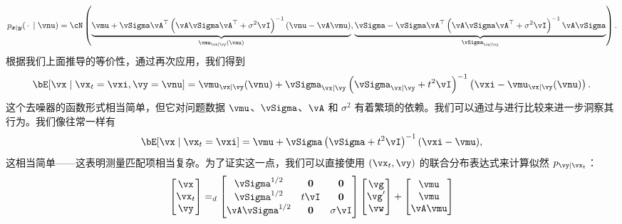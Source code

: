 \documentclass[../../book-main_zh.tex]{subfiles}
\begin{document}
\begin{example}
  \begin{equation}
    p_{\x \mid \y}(\spcdot \mid \vnu) = \cN\left(
    \underbrace{%
      \vmu + \vSigma\vA^\top \left(\vA\vSigma\vA^\top + \sigma^2 \vI\right)^{-1} 
      (\vnu - \vA\vmu)}_{\vmu_{\vx \mid \vy}(\vnu)},
      \underbrace{%
      \vSigma - \vSigma \vA^\top \left(\vA\vSigma\vA^\top + \sigma^2
      \vI\right)^{-1} \vA \vSigma}_{\vSigma_{\vx\mid \vy}}
    \right).
  \end{equation}
  根据我们上面推导的等价性，通过再次应用，我们得到
  \begin{equation}\label{eq:conditional-posterior-denoiser-gaussian-case}
    \bE[ \vx \mid \vx_t=\vxi, \vy=\vnu ]
    =
    \vmu_{\vx\mid \vy}(\vnu) + \vSigma_{\vx\mid\vy}\left(
    \vSigma_{\vx\mid \vy} + t^2 \vI 
    \right)^{-1}\left(
    \vxi - \vmu_{\vx\mid \vy}(\vnu)
    \right).
  \end{equation}
  这个去噪器的函数形式相当简单，但它对问题数据 $\vmu$、$\vSigma$、$\vA$ 和 $\sigma^2$ 有着繁琐的依赖。我们可以通过与进行比较来进一步洞察其行为。我们像往常一样有
  \begin{equation}\label{eq:posterior-denoiser-gaussian-case}
    \bE[\vx \mid \vx_t=\vxi]
    = \vmu + \vSigma\left(\vSigma + t^2 \vI\right)^{-1} (\vxi - \vmu),
  \end{equation}
  这相当简单——这表明测量匹配项相当复杂。为了证实这一点，我们可以直接使用 $(\vx_t, \vy)$ 的联合分布表达式来计算似然 $p_{\vy \mid \vx_t}$：
  \begin{equation}
    \begin{bmatrix}
      \vx \\
      \vx_t \\
      \vy
    \end{bmatrix}
    =_{d}
    \begin{bmatrix}
      \vSigma^{1/2} & \Zero & \Zero \\
      \vSigma^{1/2} & t\vI & \Zero \\
      \vA \vSigma^{1/2} & \Zero & \sigma \vI
    \end{bmatrix}
    \begin{bmatrix}
      \vg \\
      \vg' \\
      \vw
    \end{bmatrix}
    +
    \begin{bmatrix}
      \vmu \\
      \vmu \\
      \vA\vmu

\end{bmatrix}
\end{equation}
\end{example}
\end{document}

